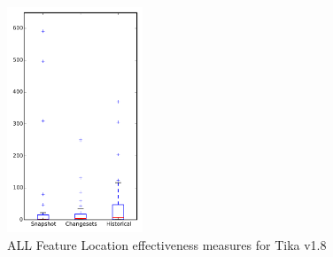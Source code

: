 
\begin{figure}[t]
\centering
\includegraphics[width=0.36\textwidth]{figures/flt/all_tika}
\caption{ALL Feature Location effectiveness measures for Tika v1.8}
\label{fig:flt:all:tika}
\end{figure}
